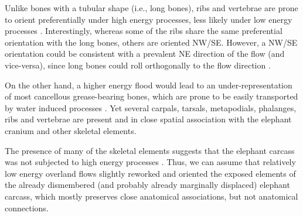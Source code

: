 \documentclass[preprint,authoryear,times]{elsarticle} %
\begin{document}


Unlike bones with a tubular shape (i.e., long bones), ribs and vertebrae are prone to orient preferentially under high energy processes, less likely under low energy processes \citep{Dominguez-Rodrigo2013,Dominguez-Rodrigo2014}. Interestingly, whereas some of the ribs share the same preferential orientation with the long bones, others are oriented NW/SE. However, a NW/SE orientation could be consistent with a prevalent NE direction of the flow (and vice-versa), since long bones could roll orthogonally to the flow direction \citep{Voorhies1969}. %

On the other hand, a higher energy flood would lead to an under-representation of most cancellous grease-bearing bones, which are prone to be easily transported by water induced processes \citep{Voorhies1969}. Yet several carpals, tarsals, metapodials, phalanges, ribs and vertebrae are present and in close spatial association with the elephant cranium and other skeletal elements.

The presence of many of the skeletal elements suggests that the elephant carcass was not subjected to high energy processes %
. Thus, we can assume that relatively low energy overland flows slightly reworked and oriented the exposed elements of the already dismembered (and probably already marginally displaced) elephant carcass, which mostly preserves close anatomical associations, but not anatomical connections.

\end{document}
